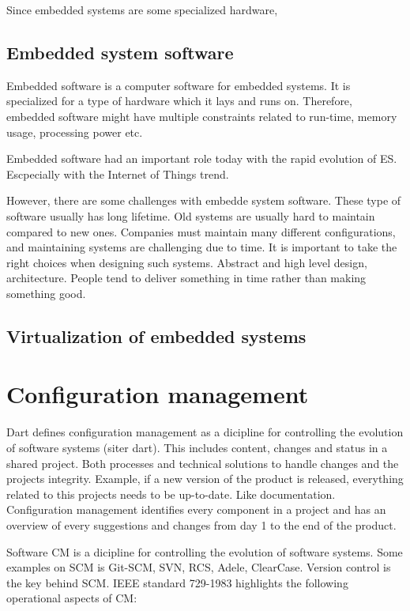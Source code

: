 Since embedded systems are some specialized hardware,


\subsection{Embedded system software}

Embedded software is a computer software for embedded systems. It is specialized for a type of hardware which it lays and runs on. Therefore, embedded software might have multiple constraints related to run-time, memory usage, processing power etc.

 
Embedded software had an important role today with the rapid evolution of ES. Escpecially with the Internet of Things trend.

However, there are some challenges with embedde system software. These type of software usually has long lifetime. Old systems are usually hard to maintain compared to new ones. Companies must maintain many different configurations, and maintaining systems are challenging due to time. It is important to take the right choices when designing such systems. Abstract and high level design, architecture. People tend to deliver something in time rather than making something good. 


\subsection{Virtualization of embedded systems}


\section{Configuration management}

Dart defines configuration management as a dicipline for controlling the evolution of software systems (siter dart). This includes content, changes and status in a shared project. Both processes and technical solutions to handle changes and the projects integrity. Example, if a new version of the product is released, everything related to this projects needs to be up-to-date. Like documentation. Configuration management identifies every component in a project and has an overview of every suggestions and changes from day 1 to the end of the product.

Software CM is a dicipline for controlling the evolution of software systems. Some examples on SCM is Git-SCM, SVN, RCS, Adele, ClearCase. Version control is the key behind SCM. IEEE standard 729-1983 highlights the following operational aspects of CM:

